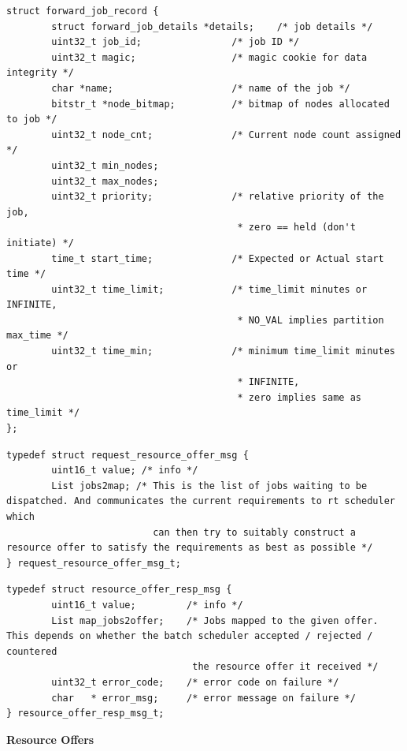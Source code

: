 \begin{lstlisting}[mathescape]
struct forward_job_record {
        struct forward_job_details *details;    /* job details */
        uint32_t job_id;                /* job ID */
        uint32_t magic;                 /* magic cookie for data integrity */
        char *name;                     /* name of the job */
        bitstr_t *node_bitmap;          /* bitmap of nodes allocated to job */
        uint32_t node_cnt;              /* Current node count assigned */
        uint32_t min_nodes;
        uint32_t max_nodes;
        uint32_t priority;              /* relative priority of the job,
                                         * zero == held (don't initiate) */
        time_t start_time;              /* Expected or Actual start time */
        uint32_t time_limit;            /* time_limit minutes or INFINITE,
                                         * NO_VAL implies partition max_time */
        uint32_t time_min;              /* minimum time_limit minutes or
                                         * INFINITE,
                                         * zero implies same as time_limit */
};
\end{lstlisting}
\begin{lstlisting}[mathescape]
typedef struct request_resource_offer_msg {
        uint16_t value; /* info */
        List jobs2map; /* This is the list of jobs waiting to be dispatched. And communicates the current requirements to rt scheduler which 
                          can then try to suitably construct a resource offer to satisfy the requirements as best as possible */
} request_resource_offer_msg_t;
\end{lstlisting}
\begin{lstlisting}[mathescape]
typedef struct resource_offer_resp_msg {
        uint16_t value;         /* info */
        List map_jobs2offer;    /* Jobs mapped to the given offer. This depends on whether the batch scheduler accepted / rejected / countered
                                 the resource offer it received */
        uint32_t error_code;    /* error code on failure */
        char   * error_msg;     /* error message on failure */
} resource_offer_resp_msg_t;
\end{lstlisting}
\textbf{Resource Offers}
